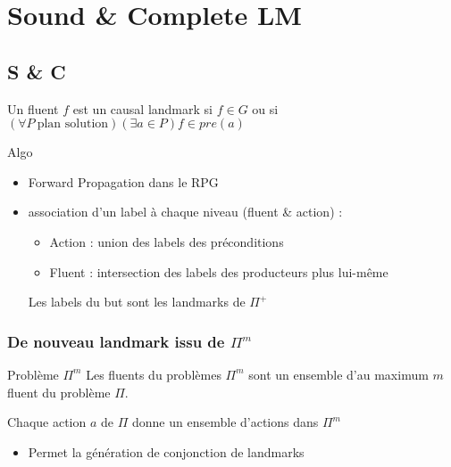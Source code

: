 \section{Sound \& Complete LM}
  \subsection*{S \& C}
\begin{frame}
  \begin{block}{}
    
  \end{block}

  \begin{definition}
    Un fluent $f$ est un causal landmark si $f \in G$ ou si $(\forall P~\text{plan solution})(\exists a \in P) f \in pre(a)$
  \end{definition}

  \begin{block}{Algo}
    \begin{itemize}
      \item Forward Propagation dans le RPG
      \item association d'un label à chaque niveau (fluent \& action) :
        \begin{itemize}
          \item Action : union des labels des préconditions
          \item Fluent : intersection des labels des producteurs plus lui-même
        \end{itemize}
      \thusitem Les labels du but sont les landmarks de $\Pi^+$
    \end{itemize}
  \end{block}
\end{frame}

\begin{frame}
  \frametitle{De nouveau landmark issu de $\Pi^m$}

  \begin{block}{}
    
  \end{block}

  \begin{block}{Problème $\Pi^m$}
    Les fluents du problèmes $\Pi^m$ sont un ensemble d'au maximum $m$ fluent du problème $\Pi$.

    Chaque action $a$ de $\Pi$ donne un ensemble d'actions dans $\Pi^m$
  \end{block}

  \begin{block}{}
    \begin{itemize}
      \item Permet la génération de conjonction de landmarks
    \end{itemize}
  \end{block}

\end{frame}

